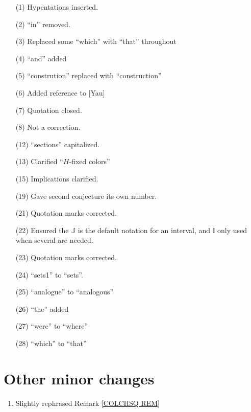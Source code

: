 \documentclass[a4paper,10pt
]{article}%
\numberwithin{equation}{section}
\numberwithin{figure}{section}
\theoremstyle{definition} %
\newcommand{\1}{\ensuremath{\mathbbm 1}}%
\begin{document}
\begin{enumerate}
\item[(1)] Hypentations inserted.
\item[(2)] ``in'' removed.
\item[(3)] Replaced some ``which'' with ``that'' throughout
\item[(4)] ``and'' added
\item[(5)] ``constrution'' replaced with ``construction''
\item[(6)] Added reference to [Yau]
\item[(7)] Quotation closed.
\item[(8)] Not a correction.
\item[(12)] ``sections'' capitalized.
\item[(13)] Clarified ``$H$-fixed colors''
\item[(15)] Implications clarified.
\item[(19)] Gave second conjecture its own number.
\item[(21)] Quotation marks corrected.
\item[(22)] Ensured the $\mathbb{J}$ is the default notation for an interval, and $\mathbb{I}$ only used when several are needed.
\item[(23)] Quotation marks corrected.
\item[(24)] ``sets1'' to ``sets''.
\item[(25)] ``analogue'' to ``analogous''
\item[(26)] ``the'' added
\item[(27)] ``were'' to ``where''
\item[(28)] ``which'' to ``that''
\end{enumerate}

\section{Other minor changes}

\begin{enumerate}
\item Slightly rephrased Remark \ref{COLCHSQ REM}
\end{enumerate}





% 
\end{document}
